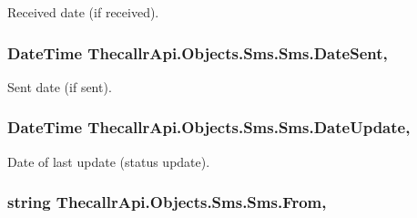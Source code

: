 Received date (if received). 

\hypertarget{class_thecallr_api_1_1_objects_1_1_sms_1_1_sms_aa042a2a85dec93e3f22c5c36534d1dfe}{
\subsubsection[{Date\+Sent}]{\setlength{\rightskip}{0pt plus 5cm}Date\+Time Thecallr\+Api.\+Objects.\+Sms.\+Sms.\+Date\+Sent\hspace{0.3cm}{\ttfamily [get]}, {\ttfamily [set]}}}\label{class_thecallr_api_1_1_objects_1_1_sms_1_1_sms_aa042a2a85dec93e3f22c5c36534d1dfe}


Sent date (if sent). 

\hypertarget{class_thecallr_api_1_1_objects_1_1_sms_1_1_sms_afe96e975ed1571dd2f5de10febd5a4ea}{
\subsubsection[{Date\+Update}]{\setlength{\rightskip}{0pt plus 5cm}Date\+Time Thecallr\+Api.\+Objects.\+Sms.\+Sms.\+Date\+Update\hspace{0.3cm}{\ttfamily [get]}, {\ttfamily [set]}}}\label{class_thecallr_api_1_1_objects_1_1_sms_1_1_sms_afe96e975ed1571dd2f5de10febd5a4ea}


Date of last update (status update). 

\hypertarget{class_thecallr_api_1_1_objects_1_1_sms_1_1_sms_a9d38d772952e23c3bfd88913b181ee06}{
\subsubsection[{From}]{\setlength{\rightskip}{0pt plus 5cm}string Thecallr\+Api.\+Objects.\+Sms.\+Sms.\+From\hspace{0.3cm}{\ttfamily [get]}, {\ttfamily [set]}}}\label{class_thecallr_api_1_1_objects_1_1_sms_1_1_sms_a9d38d772952e23c3bfd88913b181ee06}


